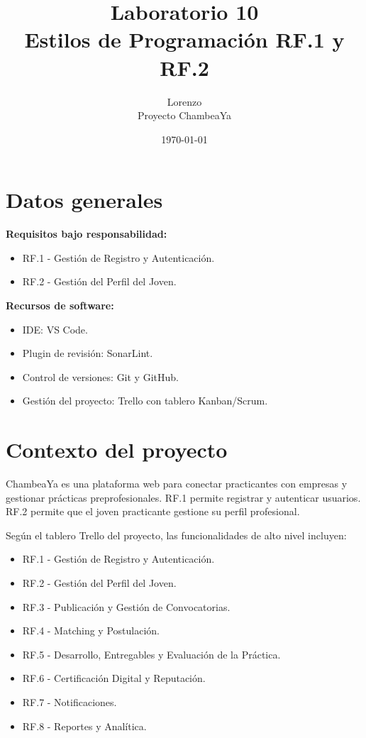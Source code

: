 \documentclass[12pt,a4paper]{article}
\title{Laboratorio 10\\Estilos de Programación RF.1 y RF.2}
\author{Lorenzo \\ Proyecto ChambeaYa}
\date{\today}
\begin{document}
\maketitle

\section{Datos generales}

\textbf{Requisitos bajo responsabilidad:}

\begin{itemize}
    \item RF.1 - Gestión de Registro y Autenticación.
    \item RF.2 - Gestión del Perfil del Joven.
\end{itemize}

\textbf{Recursos de software:}

\begin{itemize}
    \item IDE: VS Code.
    \item Plugin de revisión: SonarLint.
    \item Control de versiones: Git y GitHub.
    \item Gestión del proyecto: Trello con tablero Kanban/Scrum.
\end{itemize}

\section{Contexto del proyecto}

ChambeaYa es una plataforma web para conectar practicantes con empresas y gestionar prácticas preprofesionales. RF.1 permite registrar y autenticar usuarios. RF.2 permite que el joven practicante gestione su perfil profesional.

Según el tablero Trello del proyecto, las funcionalidades de alto nivel incluyen:

\begin{itemize}
    \item RF.1 - Gestión de Registro y Autenticación.
    \item RF.2 - Gestión del Perfil del Joven.
    \item RF.3 - Publicación y Gestión de Convocatorias.
    \item RF.4 - Matching y Postulación.
    \item RF.5 - Desarrollo, Entregables y Evaluación de la Práctica.
    \item RF.6 - Certificación Digital y Reputación.
    \item RF.7 - Notificaciones.
    \item RF.8 - Reportes y Analítica.
\end{itemize}
\end{document}
